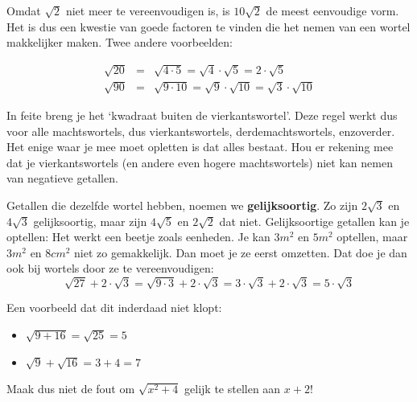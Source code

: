 Omdat $\sqrt{2}$ niet meer te vereenvoudigen is, is $10\sqrt{2}$ de meest eenvoudige vorm. Het is dus een kwestie van goede factoren te vinden die het nemen van een wortel makkelijker maken. Twee andere voorbeelden:

\begin{eqnarray*}
	\sqrt{20} &=& \sqrt{4 \cdot 5} = \sqrt{4}\cdot \sqrt{5} = 2\cdot \sqrt{5}\\
	\sqrt{90} &=& \sqrt{9 \cdot 10} = \sqrt{9} \cdot \sqrt{10} = \sqrt{3} \cdot \sqrt{10}
\end{eqnarray*}


In feite breng je het \textquoteleft kwadraat buiten de vierkantswortel\textquoteright. Deze regel werkt dus voor alle machtswortels, dus vierkantswortels, derdemachtswortels, enzoverder. Het enige waar je mee moet opletten is dat alles bestaat. Hou er rekening mee dat je vierkantswortels (en andere even hogere machtswortels) niet kan nemen van negatieve getallen.

Getallen die dezelfde wortel hebben, noemen we \textbf{gelijksoortig}. Zo zijn  $2\sqrt{3}$ en $4\sqrt{3}$ gelijksoortig, maar zijn $4\sqrt{5}$ en $2\sqrt{2}$ dat niet. Gelijksoortige getallen kan je optellen:
Het werkt een beetje zoals eenheden. Je kan $3m^2$ en $5m^2$ optellen, maar $3m^2$ en $8cm^2$ niet zo gemakkelijk. Dan moet je ze eerst omzetten. Dat doe je dan ook bij wortels door ze te vereenvoudigen:
\begin{equation*}
\sqrt{27}+2\cdot\sqrt{3}=\sqrt{9 \cdot 3}+2\cdot \sqrt{3}=3\cdot\sqrt{3}+2\cdot\sqrt{3}=5 \cdot \sqrt{3}
\end{equation*}



Een voorbeeld dat dit inderdaad niet klopt:
\begin{itemize}
	\item $\sqrt{9+16}=\sqrt{25}=5$
	\item $\sqrt{9}+\sqrt{16}=3+4=7$
\end{itemize}

Maak dus niet de fout om  $\sqrt{x^2+4}$ gelijk te stellen aan $x+2$!

